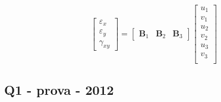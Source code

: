 %
\begin{equation}
	\begin{bmatrix}
		\varepsilon_x\\
		\varepsilon_y\\
		\gamma_{xy} 	
	\end{bmatrix} = 
	\begin{bmatrix}
		\mathbf{B}_1& \mathbf{B}_2 & \mathbf{B}_3 
	\end{bmatrix}
	\begin{bmatrix}
		u_1	\\
		v_1	\\
		u_2	\\
		v_2	\\
		u_3	\\
		v_3	\\
	\end{bmatrix}
\end{equation}
%
\color{black}
%




\subsection{Q1 - prova - 2012}

